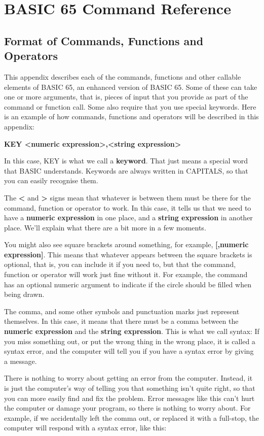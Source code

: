 \chapter{BASIC 65 Command Reference}

\section{Format of Commands, Functions and Operators}

This appendix describes each of the commands, functions and other
callable elements of BASIC 65, an enhanced version of BASIC 65.
Some of these can take one or more arguments, that is, pieces of input
that you provide as part of the command or function call.
Some also require that you use special keywords.
Here is an example of how commands, functions and operators will be
described in this appendix:

{\bf KEY <numeric expression>,<string expression> }

In this case, KEY is what we call a \textbf{keyword}. That just means
a special word that BASIC understands.
Keywords are always written in CAPITALS, so that you can easily
recognise them.

The {\bf <} and {\bf >} signs mean that whatever is between them must
be there for the command, function or operator to work.
In this case, it tells us that we need to have a
{\bf numeric expression} in one place, and a {\bf string expression}
in another place.
We'll explain what there are a bit more in a few moments.

You might also see square brackets around something, for example,
{\bf [,numeric expression]}.
This means that whatever appears between the square brackets is
optional, that is, you can include it if you need to, but
that the command, function or operator will work just fine without it.
For example, the  command has
an optional numeric argument to indicate if the circle should be filled
when being drawn.

The comma, and some other symbols and punctuation marks just represent themselves.
In this case, it means that there must be a comma between the
{\bf numeric expression} and the {\bf string expression}.
This is what we call syntax: If you miss something out, or put the
wrong thing in the wrong place, it is called a
syntax error, and the computer will tell you if you have a syntax error
by giving a  message.

There is nothing to worry about getting an error from the computer.
Instead, it is just the computer's way of telling you that something
isn't quite right, so that you can more easily
find and fix the problem.
Error messages like this can't hurt the computer or damage your program,
so there is nothing to worry about.
For example, if we accidentally left the comma out, or replaced it with
a full-stop, the computer will respond with
a syntax error, like this:

